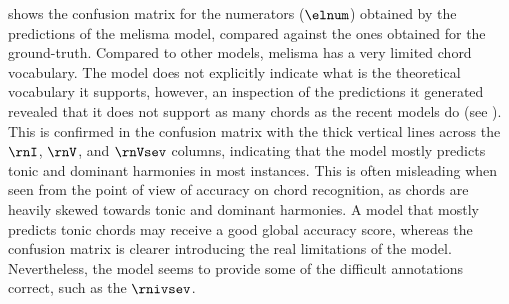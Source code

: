 

 shows the confusion matrix
for the numerators ($\elnum$) obtained by the predictions of
the \gls{melisma} model, compared against the ones obtained
for the ground-truth. Compared to other models,
\gls{melisma} has a very limited chord vocabulary. The model
does not explicitly indicate what is the theoretical
vocabulary it supports, however, an inspection of the
predictions it generated revealed that it does not support
as many chords as the recent models do (see
). This is confirmed in the
confusion matrix with the thick vertical lines across the
$\rnI$, $\rnV$, and $\rnVsev$ columns, indicating that the
model mostly predicts tonic and dominant harmonies in most
instances. This is often misleading when seen from the point
of view of accuracy on chord recognition, as chords are
heavily skewed towards tonic and dominant harmonies. A model
that mostly predicts tonic chords may receive a good global
accuracy score, whereas the confusion matrix is clearer
introducing the real limitations of the model. Nevertheless,
the model seems to provide some of the difficult annotations
correct, such as the $\rnivsev$.



